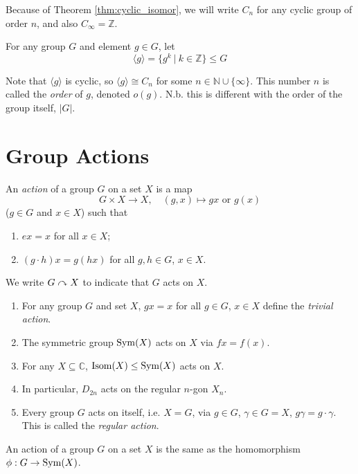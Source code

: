 \documentclass[10pt, a4paper, twoside]{report}
\begin{document}
Because of Theorem \ref{thm:cyclic_isomor}, we will write \(C_n\) for any cyclic group of order \(n\), and also \(C_\infty=\mathbb{Z}\).
\begin{definition}
    For any group \(G\) and element \(g\in G\), let
    \[\langle g\rangle=\{g^k\:|\:k\in\mathbb{Z}\}\leq G\]
\end{definition}
Note that \(\langle g\rangle\) is cyclic, so \(\langle g\rangle\cong C_n\) for some \(n\in\mathbb{N}\cup\{\infty\}\). This number \(n\) is called the \emph{order} of \(g\), denoted \(o(g)\). N.b. this is different with the order of the group itself, \(|G|\). 
\section{Group Actions}
\begin{definition}
    An \emph{action} of a group \(G\) on a set \(X\) is a map 
    \[G\times X\to X,\quad (g,x)\mapsto gx\text{  or  }g(x)\]
    (\(g\in G\) and \(x\in X\)) such that 
    \begin{enumerate}
        \item \(ex=x\) for all \(x\in X\);
        \item \((g\cdot h)x=g(hx)\) for all \(g,h\in G\), \(x\in X\).
    \end{enumerate}
\end{definition}
We write \(G\curvearrowright X\) to indicate that \(G\) acts on \(X\).
\begin{example} \item[] 
    \begin{enumerate}
        \item For any group \(G\) and set \(X\), \(gx=x\) for all \(g\in G\), \(x\in X\) define the \emph{trivial action}.
        \item The symmetric group \(\operatorname{Sym}(X)\) acts on \(X\) via \(fx=f(x)\).
        \item For any \(X\subseteq\mathbb{C}\), \(\operatorname{Isom}(X)\leq\operatorname{Sym}(X)\) acts on \(X\).
        \item In particular, \(D_{2n}\) acts on the regular \(n\)-gon \(X_n\). 
        \item Every group \(G\) acts on itself, i.e. \(X=G\), via \(g\in G\), \(\gamma\in G=X\), \(g\gamma=g\cdot\gamma\). This is called the \emph{regular action}.
    \end{enumerate}
\end{example}
\begin{theorem}
    An action of a group \(G\) on a set \(X\) is the same as the homomorphism \(\phi:G\to\operatorname{Sym}(X)\).
    \label{thm:action_homom}
\end{theorem}
\end{document}

